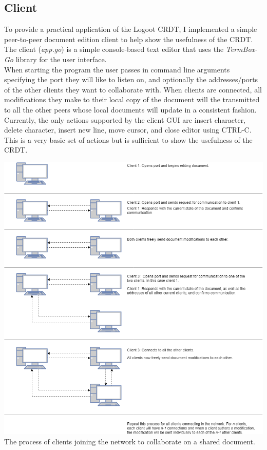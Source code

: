 \documentclass[11pt]{article}
\begin{document}
\subsection{Client}
To provide a practical application of the Logoot CRDT, I implemented a simple peer-to-peer document edition client to help show the usefulness of the CRDT. The client (\textit{app.go}) is a simple console-based text editor that uses the \textit{TermBox-Go} library for the user interface.\\

When starting the program the user passes in command line arguments specifying the port they will like to listen on, and optionally the addresses/ports of the other clients they want to collaborate with. When clients are connected, all modifications they make to their local copy of the document will the transmitted to all the other peers whose local documents will update in a consistent fashion. Currently, the only actions supported by the client GUI are insert character, delete character, insert new line, move cursor, and close editor using CTRL-C. This is a very basic set of actions but is sufficient to show the usefulness of the CRDT.

\begin{center}
	\includegraphics[scale=0.5]{connecting.png}\\
	The process of clients joining the network to collaborate on a shared document.
\end{center}
\end{document}
